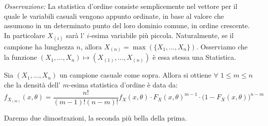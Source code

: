 \textit{Osservazione:} La statistica d'ordine consiste semplicemente nel vettore per il quale le variabili casuali vengono appunto ordinate, in base al valore che assumono in un determinato punto del loro dominio comune, in ordine crescente. In particolare $X_{(i)}$ sarà l' $i$-esima variabile più piccola. Naturalmente, se il campione ha lunghezza $n$, allora $X_{(n)}=\max\left(\{X_1,\ldots,X_n\}\right)$. 
Osserviamo che la funzione $\left(X_1,\ldots,X_n\right)\longmapsto \left(X_{(1)},\ldots,X_{(n)}\right)$ è essa stessa una Statistica.
\begin{teo}
Sia $\left(X_1,\ldots,X_n\right)$ un campione casuale come sopra. Allora si ottiene $\forall$ $1\leq m\leq n$ che la densità dell' $m$-esima statistica d'ordine è data da: 
\begin{displaymath}
f_{X_{(m)}}\left(x,\theta\right)=\frac{n!}{(m-1)!(n-m)!}f_X\left(x,\theta\right)\cdot F_X\left(x,\theta\right)^{m-1}\cdot \big(1-F_X\left(x,\theta\right)\big)^{n-m}
\end{displaymath}
\end{teo}
Daremo due dimostrazioni, la seconda più bella della prima.
